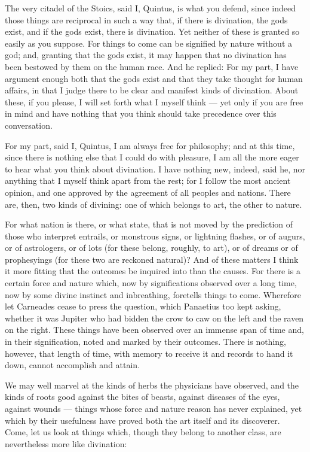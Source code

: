  The very citadel of the Stoics, said I, Quintus, is what you defend, since indeed those things are reciprocal in such a way that, if there is divination, the gods exist, and if the gods exist, there is divination. Yet neither of these is granted so easily as you suppose. For things to come can be signified by nature without a god; and, granting that the gods exist, it may happen that no divination has been bestowed by them on the human race. And he replied: For my part, I have argument enough both that the gods exist and that they take thought for human affairs, in that I judge there to be clear and manifest kinds of divination. About these, if you please, I will set forth what I myself think — yet only if you are free in mind and have nothing that you think should take precedence over this conversation.

 For my part, said I, Quintus, I am always free for philosophy; and at this time, since there is nothing else that I could do with pleasure, I am all the more eager to hear what you think about divination. I have nothing new, indeed, said he, nor anything that I myself think apart from the rest; for I follow the most ancient opinion, and one approved by the agreement of all peoples and nations. There are, then, two kinds of divining: one of which belongs to art, the other to nature.

 For what nation is there, or what state, that is not moved by the prediction of those who interpret entrails, or monstrous signs, or lightning flashes, or of augurs, or of astrologers, or of lots (for these belong, roughly, to art), or of dreams or of prophesyings (for these two are reckoned natural)? And of these matters I think it more fitting that the outcomes be inquired into than the causes. For there is a certain force and nature which, now by significations observed over a long time, now by some divine instinct and inbreathing, foretells things to come. Wherefore let Carneades cease to press the question, which Panaetius too kept asking, whether it was Jupiter who had bidden the crow to caw on the left and the raven on the right. These things have been observed over an immense span of time and, in their signification, noted and marked by their outcomes. There is nothing, however, that length of time, with memory to receive it and records to hand it down, cannot accomplish and attain.

 We may well marvel at the kinds of herbs the physicians have observed, and the kinds of roots good against the bites of beasts, against diseases of the eyes, against wounds — things whose force and nature reason has never explained, yet which by their usefulness have proved both the art itself and its discoverer. Come, let us look at things which, though they belong to another class, are nevertheless more like divination:

